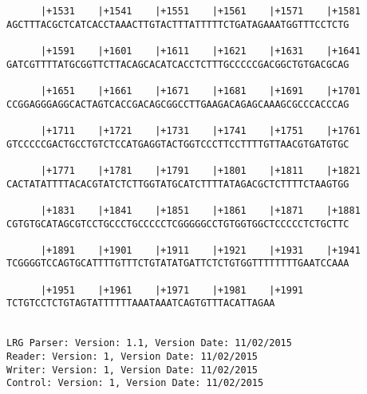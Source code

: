 \documentclass{article}
\begin{document}
\begin{Verbatim}
      |+1531    |+1541    |+1551    |+1561    |+1571    |+1581
AGCTTTACGCTCATCACCTAAACTTGTACTTTATTTTTCTGATAGAAATGGTTTCCTCTG
                                                            
      |+1591    |+1601    |+1611    |+1621    |+1631    |+1641
GATCGTTTTATGCGGTTCTTACAGCACATCACCTCTTTGCCCCCGACGGCTGTGACGCAG
                                                            
      |+1651    |+1661    |+1671    |+1681    |+1691    |+1701
CCGGAGGGAGGCACTAGTCACCGACAGCGGCCTTGAAGACAGAGCAAAGCGCCCACCCAG
                                                            
      |+1711    |+1721    |+1731    |+1741    |+1751    |+1761
GTCCCCCGACTGCCTGTCTCCATGAGGTACTGGTCCCTTCCTTTTGTTAACGTGATGTGC
                                                            
      |+1771    |+1781    |+1791    |+1801    |+1811    |+1821
CACTATATTTTACACGTATCTCTTGGTATGCATCTTTTATAGACGCTCTTTTCTAAGTGG
                                                            
      |+1831    |+1841    |+1851    |+1861    |+1871    |+1881
CGTGTGCATAGCGTCCTGCCCTGCCCCCTCGGGGGCCTGTGGTGGCTCCCCCTCTGCTTC
                                                            
      |+1891    |+1901    |+1911    |+1921    |+1931    |+1941
TCGGGGTCCAGTGCATTTTGTTTCTGTATATGATTCTCTGTGGTTTTTTTTGAATCCAAA
                                                            
      |+1951    |+1961    |+1971    |+1981    |+1991
TCTGTCCTCTGTAGTATTTTTTAAATAAATCAGTGTTTACATTAGAA

                                               
LRG Parser: Version: 1.1, Version Date: 11/02/2015
Reader: Version: 1, Version Date: 11/02/2015
Writer: Version: 1, Version Date: 11/02/2015
Control: Version: 1, Version Date: 11/02/2015
\end{Verbatim}
\end{document}
